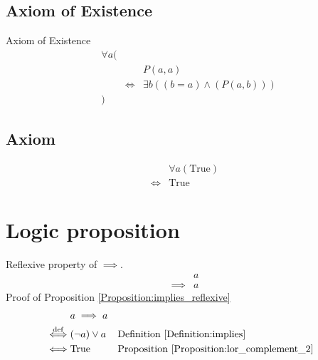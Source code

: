 \subsection{Axiom of Existence}
\begin{axm}
\label{Axiom:axiom_of_existence}
Axiom of Existence
\begin{align*}
& \forall a ( \\
& & & P(a,a) \\
& & \iff & \exists b ((b = a) \land (P(a,b))) \\
& )
\end{align*}
\end{axm}

\subsection{Axiom}
\begin{axm}
\label{Axiom:forall_true}
\begin{align*}
& \forall a (\text{True}) \\
\iff & \text{True}
\end{align*}
\end{axm}

\section{Logic proposition}
\begin{prop}
\label{Proposition:implies_reflexive}
Reflexive property of $\implies$.
\begin{align*}
& a \\
\implies & a
\end{align*}
Proof of Proposition \ref{Proposition:implies_reflexive}
\begin{align*}
& a \implies a \\
\overset{\operatorname{def}}{\iff} & (\lnot a) \lor a
& & \text{Definition \ref{Definition:implies}} \\
\iff & \text{True}
& & \text{Proposition \ref{Proposition:lor_complement_2}} \\
\end{align*}
\end{prop}

